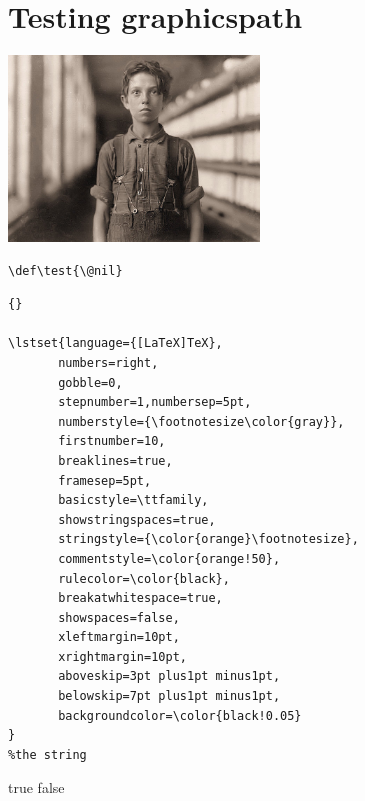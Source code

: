 \documentclass{article}
\begin{document}
\section{Testing graphicspath}

\graphicspath{{./images/}}
\includegraphics[width=0.5\textwidth]{hine02}

\lipsum[1]

\begin{verbatim}
\def\test{\@nil}
\end{verbatim}


\begin{lstlisting}{}

\lstset{language={[LaTeX]TeX},
       numbers=right, 
       gobble=0,
       stepnumber=1,numbersep=5pt, 
       numberstyle={\footnotesize\color{gray}},
       firstnumber=10,
       breaklines=true,
       framesep=5pt,
       basicstyle=\ttfamily,
       showstringspaces=true,
       stringstyle={\color{orange}\footnotesize},
       commentstyle=\color{orange!50},
       rulecolor=\color{black},
       breakatwhitespace=true,
       showspaces=false, 
       xleftmargin=10pt,
       xrightmargin=10pt,
       aboveskip=3pt plus1pt minus1pt, 
       belowskip=7pt plus1pt minus1pt,  
       backgroundcolor=\color{black!0.05}
}
%the string
\end{lstlisting}

\ifx\fmtname\nameofplainTeX
    true
\else
   false
\fi
\end{document}
